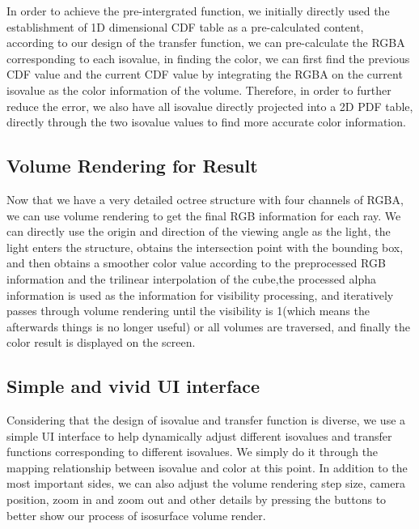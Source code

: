 \documentclass[sigconf]{acmart}
\begin{document}
In order to achieve the pre-intergrated function, we initially directly used the establishment of 1D dimensional CDF table as a pre-calculated content, according to our design of the transfer function, we can pre-calculate the RGBA corresponding to each isovalue, in finding the color, we can first find the previous CDF value and the current CDF value by integrating the RGBA on the current isovalue as the color information of the volume.
Therefore, in order to further reduce the error, we also have all isovalue directly projected into a 2D PDF table, directly through the two isovalue values to find more accurate color information.


\subsection{Volume Rendering for Result}
Now that we have a very detailed octree structure with four channels of RGBA, we can use volume rendering to get the final RGB information for each ray. We can directly use the origin and direction of the viewing angle as the light, the light enters the structure, obtains the intersection point with the bounding box, and then obtains a smoother color value according to the preprocessed RGB information and the trilinear interpolation of the cube,the processed alpha information is used as the information for visibility processing, and iteratively passes through volume rendering until the visibility is 1(which means the afterwards things is no longer useful) or all volumes are traversed, and finally the  color result is displayed on the screen.

\subsection{Simple and vivid UI interface}
Considering that the design of isovalue and transfer function is diverse, we use a simple UI interface to help dynamically adjust different isovalues and transfer functions corresponding to different isovalues. We simply do it through the mapping relationship between isovalue and color at this point. In addition to the most important sides, we can also adjust the volume rendering step size, camera position, zoom in and zoom out and other details by pressing the buttons to better show our process of isosurface volume render.
\end{document}
